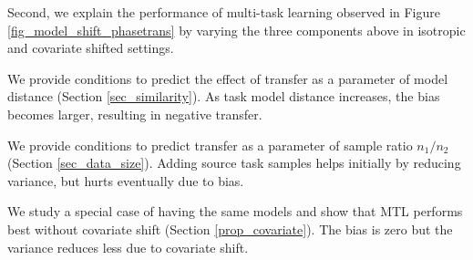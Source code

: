 Second, we explain the performance of multi-task learning observed in Figure \ref{fig_model_shift_phasetrans} by varying the three components above in isotropic and covariate shifted settings.
\squishlist
	\item We provide conditions to predict the effect of transfer as a parameter of model distance (Section \ref{sec_similarity}).
	As task model distance increases, the bias becomes larger, resulting in negative transfer.
	\item We provide conditions to predict transfer as a parameter of sample ratio $n_1/n_2$ (Section \ref{sec_data_size}).
	Adding source task samples helps initially by reducing variance, but hurts eventually due to bias.
	\item We study a special case of having the same models and show that MTL  performs best without covariate shift (Section \ref{prop_covariate}).
	The bias is zero but the variance reduces less due to covariate shift.
\squishend
